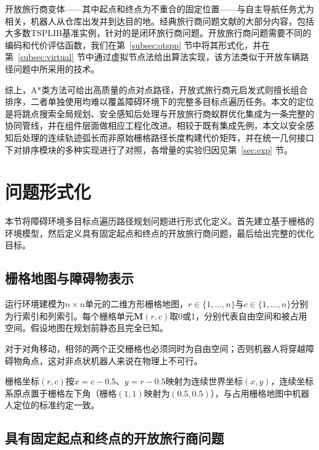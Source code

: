 \documentclass[lettersize,journal]{IEEEtran}
\begin{document}
开放旅行商变体——其中起点和终点为不重合的固定位置——与自主导航任务尤为相关，机器人从仓库出发并到达目的地。经典旅行商问题文献的大部分内容，包括大多数TSPLIB基准实例，针对的是闭环旅行商问题。开放旅行商问题需要不同的编码和代价评估函数，我们在第~\textcolor{blue}{\ref{subsec:otspp}} 节中将其形式化，并在第~\textcolor{blue}{\ref{subsec:virtual}} 节中通过虚拟节点法给出算法实现，该方法类似于开放车辆路径问题中所采用的技术\textcolor{blue}{\cite{ref32}}。

综上，A*类方法可给出高质量的点对点路径，开放式旅行商元启发式则擅长组合排序，二者单独使用均难以覆盖障碍环境下的完整多目标点遍历任务。本文的定位是将跳点搜索全局规划、安全感知后处理与开放旅行商蚁群优化集成为一条完整的协同管线，并在组件层面做相应工程化改进。相较于既有集成先例\textcolor{blue}{\cite{ref1,ref2}}，本文以安全感知后处理的连续轨迹弧长而非原始栅格路径长度构建代价矩阵，并在统一几何接口下对排序模块的多种实现进行了对照，各增量的实验归因见第~\textcolor{blue}{\ref{sec:exp}} 节。

\section{问题形式化}

\label{sec:form}

本节将障碍环境多目标点遍历路径规划问题进行形式化定义。首先建立基于栅格的环境模型，然后定义具有固定起点和终点的开放旅行商问题，最后给出完整的优化目标。

\subsection{栅格地图与障碍物表示}

运行环境建模为$n \times n$单元的二维方形栅格地图，$r \in \{1, \dots, n\}$与$c \in \{1, \dots, n\}$分别为行索引和列索引。每个栅格单元$\mathbf{M}(r, c)$取0或1，分别代表自由空间和被占用空间。假设地图在规划前静态且完全已知。

对于对角移动，相邻的两个正交栅格也必须同时为自由空间；否则机器人将穿越障碍物角点，这对非点状机器人来说在物理上不可行。

栅格坐标$(r, c)$按$x = c - 0.5$、$y = r - 0.5$映射为连续世界坐标$(x, y)$，连续坐标系原点置于栅格左下角（栅格$(1,1)$映射为$(0.5, 0.5)$），与占用栅格地图中机器人定位的标准约定一致。

\subsection{具有固定起点和终点的开放旅行商问题}
\end{document}
